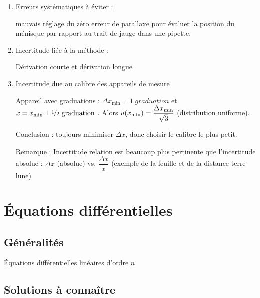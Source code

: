 \documentclass[a4paper,french,bookmarks]{book}
\begin{document}
    \begin{enumerate}
        \item Erreurs systématiques à éviter :
        \begin{enumerate}
            \itast mauvais réglage du zéro 
            \itast erreur de parallaxe pour évaluer la position du ménisque par rapport au trait de jauge dans une pipette.
        \end{enumerate}
        
        \item Incertitude liée à la méthode :
        
        Dérivation courte et dérivation longue
        
         \item Incertitude due au calibre des appareils de mesure 
         
         Appareil avec graduations : $\Delta x_\text{min} = \SI{1}{graduation}$ et $x = x_\text{min} \pm \sfrac{1}{2} \ \text{graduation}$ . Alors $u\!\left(x_\text{min}\right) = \dfrac{\Delta x_\text{min}}{\sqrt{3}}$ (distribution uniforme).
         
         Conclusion : toujours minimiser $\Delta x$, donc choisir le calibre le plus petit. 
         
         Remarque : Incertitude relation est beaucoup plus pertinente que l'incertitude absolue : $\Delta x$ (absolue) vs. $\dfrac{\Delta x}{x}$ (exemple de la feuille et de la distance terre-lune)
    \end{enumerate}
    
    \section{Équations différentielles}
    
    \subsection{Généralités}
    
    \begin{definition}{Équations différentielles linéaires d'ordre $n$}{}
        
    \end{definition}
    
    \subsection{Solutions à connaître}
    
\end{document}
